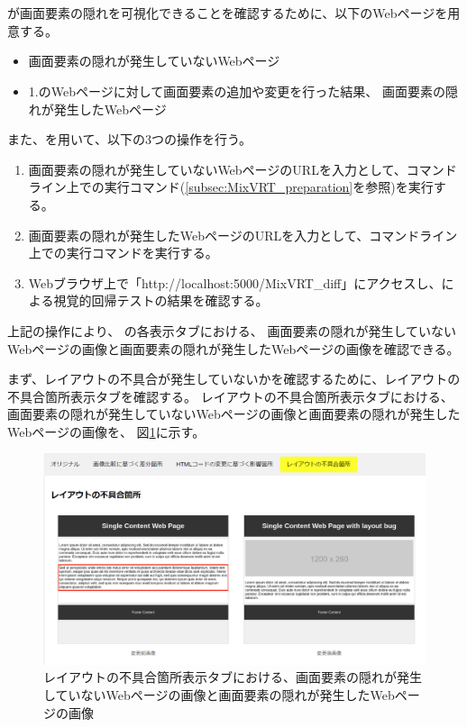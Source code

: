 \section{}\label{sec:result_area_detection}
\toolName が画面要素の隠れを可視化できることを確認するために、以下のWebページを用意する。
\begin{itemize}
    \setlength{\itemsep}{0pt}
          \setlength{\parsep}{0pt}
    \item 画面要素の隠れが発生していないWebページ\label{item: ex1_bf}
    \item 1.のWebページに対して画面要素の追加や変更を行った結果、
          画面要素の隠れが発生したWebページ\label{item: ex1_af}
\end{itemize}
また、\toolName を用いて、以下の3つの操作を行う。
\begin{enumerate}[label=操作\arabic*., leftmargin=1.8cm]
    \item 画面要素の隠れが発生していないWebページのURLを入力として、コマンドライン上で\toolName の実行コマンド(\ref{subsec:MixVRT_preparation}を参照)を実行する。
    \item 画面要素の隠れが発生したWebページのURLを入力として、コマンドライン上で\toolName の実行コマンドを実行する。
    \item Webブラウザ上で「http://localhost:5000/MixVRT\_diff」にアクセスし、\toolName による視覚的回帰テストの結果を確認する。
\end{enumerate}
\par
上記の操作により、
\toolName の各表示タブにおける、
画面要素の隠れが発生していないWebページの画像と画面要素の隠れが発生したWebページの画像を確認できる。
\par
まず、レイアウトの不具合が発生していないかを確認するために、レイアウトの不具合箇所表示タブを確認する。
レイアウトの不具合箇所表示タブにおける、画面要素の隠れが発生していないWebページの画像と画面要素の隠れが発生したWebページの画像を、
図\ref{fig: ex1_subeffect}に示す。
\begin{figure}[tp]
    \begin{center}
        \includegraphics[width=1.0\columnwidth]{image/5/ex1_subeffect.png}
        \caption{レイアウトの不具合箇所表示タブにおける、画面要素の隠れが発生していないWebページの画像と画面要素の隠れが発生したWebページの画像}
        \label{fig: ex1_subeffect}
    \end{center}
\end{figure}
